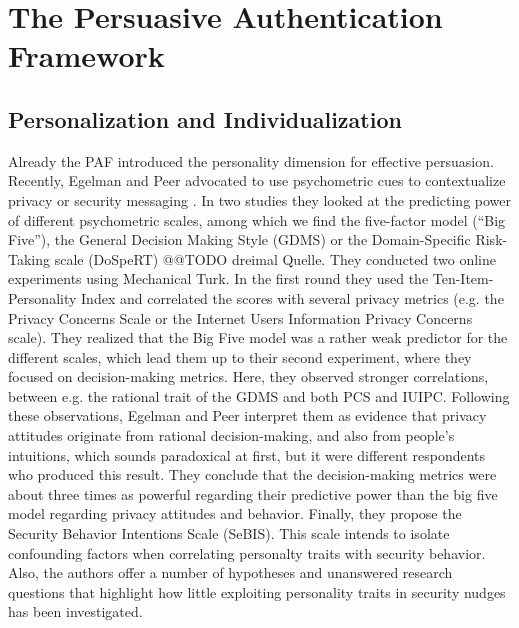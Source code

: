 \section{The Persuasive Authentication Framework}


\subsection{Personalization and Individualization}
Already the PAF introduced the personality dimension for effective persuasion. Recently, Egelman and Peer advocated to use psychometric cues to contextualize privacy or security messaging \cite{Egelman2015AverageUser}. In two studies they looked at the predicting power of different psychometric scales, among which we find the five-factor model (``Big Five''), the General Decision Making Style (GDMS) or the Domain-Specific Risk-Taking scale (DoSpeRT) @@TODO dreimal Quelle. They conducted two online experiments using Mechanical Turk. In the first round they used the Ten-Item-Personality Index and correlated the scores with several privacy metrics (e.g. the Privacy Concerns Scale or the Internet Users Information Privacy Concerns scale). They realized that the Big Five model was a rather weak predictor for the different scales, which lead them up to their second experiment, where they focused on decision-making metrics. Here, they observed stronger correlations, between e.g. the rational trait of the GDMS and both PCS and IUIPC. Following these observations, Egelman and Peer interpret them as evidence that privacy attitudes originate from rational decision-making, and also from people's intuitions, which sounds paradoxical at first, but it were different respondents who produced this result. They conclude that the decision-making metrics were about three times as powerful regarding their predictive power than the big five model regarding privacy attitudes and behavior. Finally, they propose the Security Behavior Intentions Scale (SeBIS). This scale intends to isolate confounding factors when correlating personalty traits with security behavior. Also, the authors offer a number of hypotheses and unanswered research questions that highlight how little exploiting personality traits in security nudges has been investigated. 


